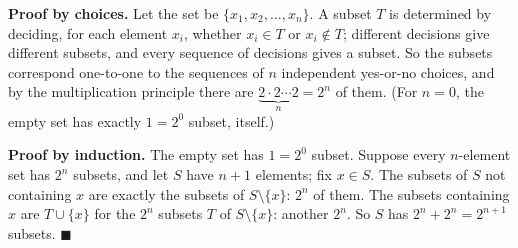 \textbf{Proof by choices.} Let the set be $\{x_1,x_2,\dots,x_n\}$. A subset $T$ is determined by deciding, for each element $x_i$, whether $x_i\in T$ or $x_i\notin T$; different decisions give different subsets, and every sequence of decisions gives a subset. So the subsets correspond one-to-one to the sequences of $n$ independent yes-or-no choices, and by the multiplication principle there are $\underbrace{2\cdot2\cdots2}_{n}=2^n$ of them. (For $n=0$, the empty set has exactly $1=2^0$ subset, itself.)

\textbf{Proof by induction.} The empty set has $1=2^0$ subset. Suppose every $n$-element set has $2^n$ subsets, and let $S$ have $n+1$ elements; fix $x\in S$. The subsets of $S$ not containing $x$ are exactly the subsets of $S\setminus\{x\}$: $2^n$ of them. The subsets containing $x$ are $T\cup\{x\}$ for the $2^n$ subsets $T$ of $S\setminus\{x\}$: another $2^n$. So $S$ has $2^n+2^n=2^{n+1}$ subsets. $\blacksquare$
